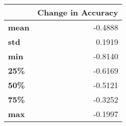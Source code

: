 \begin{tabular}{lr}
\toprule
{} &  Change in Accuracy \\
\midrule
\textbf{mean} &             -0.4888 \\
\textbf{std } &              0.1919 \\
\textbf{min } &             -0.8140 \\
\textbf{25\% } &             -0.6169 \\
\textbf{50\% } &             -0.5121 \\
\textbf{75\% } &             -0.3252 \\
\textbf{max } &             -0.1997 \\
\bottomrule
\end{tabular}
